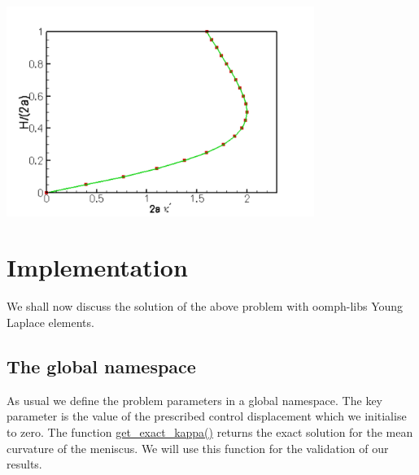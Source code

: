  
\begin{DoxyImage}
\includegraphics[width=0.75\textwidth]{trace}
\end{DoxyImage}




 

\hypertarget{index_impl}{}\section{Implementation}\label{index_impl}
We shall now discuss the solution of the above problem with {\ttfamily oomph-\/lib\textquotesingle{}s} Young Laplace elements.\hypertarget{index_namespace}{}\subsection{The global namespace}\label{index_namespace}
As usual we define the problem parameters in a global namespace. The key parameter is the value of the prescribed control displacement which we initialise to zero. The function {\ttfamily \hyperlink{namespaceGlobalParameters_a4571d41514b16946dd31d075d44c5593}{get\+\_\+exact\+\_\+kappa()}} returns the exact solution for the mean curvature of the meniscus. We will use this function for the validation of our results.

